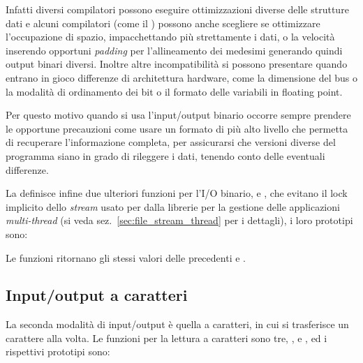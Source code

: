Infatti diversi compilatori possono eseguire ottimizzazioni diverse delle
strutture dati e alcuni compilatori (come il ) possono anche
scegliere se ottimizzare l'occupazione di spazio, impacchettando più
strettamente i dati, o la velocità inserendo opportuni \textit{padding} per
l'allineamento dei medesimi generando quindi output binari diversi. Inoltre
altre incompatibilità si possono presentare quando entrano in gioco differenze
di architettura hardware, come la dimensione del bus o la modalità di
ordinamento dei bit o il formato delle variabili in floating point.

Per questo motivo quando si usa l'input/output binario occorre sempre prendere
le opportune precauzioni come usare un formato di più alto livello che
permetta di recuperare l'informazione completa, per assicurarsi che versioni
diverse del programma siano in grado di rileggere i dati, tenendo conto delle
eventuali differenze.

La  definisce infine due ulteriori funzioni per l'I/O binario,
 e , che evitano il lock
implicito dello \textit{stream} usato per dalla librerie per la gestione delle
applicazioni \textit{multi-thread} (si veda sez.~\ref{sec:file_stream_thread}
per i dettagli), i loro prototipi sono:

\begin{funcproto}{
}

{Le funzioni ritornano gli stessi valori delle precedenti  e
  .}
\end{funcproto}



\subsection{Input/output a caratteri}
\label{sec:file_char_io}

La seconda modalità di input/output è quella a caratteri, in cui si
trasferisce un carattere alla volta.  Le funzioni per la lettura a
caratteri sono tre, ,  e , ed i
rispettivi prototipi sono:

